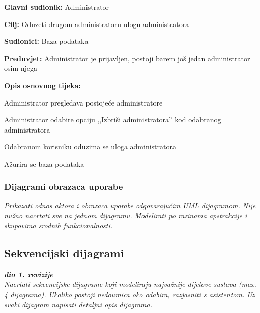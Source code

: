 						\noindent {}
						\begin{packed_item}
							
							\item \textbf{Glavni sudionik: }Administrator
							\item  \textbf{Cilj: }Oduzeti drugom administratoru ulogu administratora
							\item  \textbf{Sudionici: }Baza podataka
							\item  \textbf{Preduvjet: }Administrator je prijavljen, postoji barem još jedan administrator osim njega
							\item  \textbf{Opis osnovnog tijeka:}
							
							\item[] \begin{packed_enum}
								
								\item Administrator pregledava postojeće administratore
								\item Administrator odabire opciju ,,Izbriši administratora” kod odabranog administratora
								\item Odabranom korisniku oduzima se uloga administratora
								\item Ažurira se baza podataka
		 
							\end{packed_enum}
							
							
						\end{packed_item}
						
					
				\subsubsection{Dijagrami obrazaca uporabe}
					
					\textit{Prikazati odnos aktora i obrazaca uporabe odgovarajućim UML dijagramom. Nije nužno nacrtati sve na jednom dijagramu. Modelirati po razinama apstrakcije i skupovima srodnih funkcionalnosti.}
				\eject		
				
			\subsection{Sekvencijski dijagrami}
				
				\textbf{\textit{dio 1. revizije}}\\
				
				\textit{Nacrtati sekvencijske dijagrame koji modeliraju najvažnije dijelove sustava (max. 4 dijagrama). Ukoliko postoji nedoumica oko odabira, razjasniti s asistentom. Uz svaki dijagram napisati detaljni opis dijagrama.}
				\eject
	
